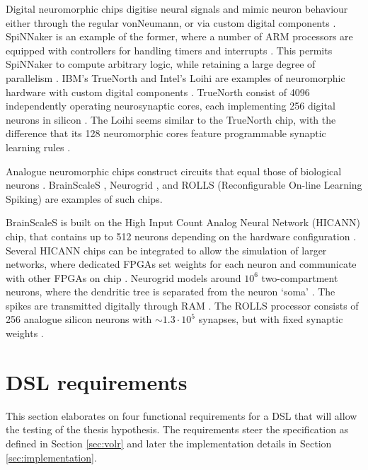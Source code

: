 \documentclass[report.tex]{subfiles}
\begin{document}
Digital neuromorphic chips digitise neural signals and mimic neuron
behaviour either through the regular \gls{vonNeumann}, or
via custom digital components \cite{Walter2015}.
SpiNNaker is an example of the former, where a number of \gls{ARM}
processors are equipped with controllers for handling timers and
interrupts \cite{Walter2015}.
This permits SpiNNaker to compute arbitrary logic, while retaining
a large degree of parallelism \cite{Albada2018}.
IBM's TrueNorth  and Intel's Loihi 
are examples of neuromorphic hardware with custom digital components 
\cite{Walter2015, Lin2018}.
TrueNorth consist of 4096 independently operating neurosynaptic cores, each implementing 256
digital neurons in silicon \cite{Walter2015, ArtificialBrains2018}.
The Loihi seems similar to the TrueNorth chip, with the difference that
its 128 neuromorphic cores feature programmable
synaptic learning rules \cite{Lin2018}.

Analogue neuromorphic chips construct circuits that equal those of biological
neurons \cite{Walter2015}.
BrainScaleS \cite{Schmitt2017}, Neurogrid \cite{BrainsInSilicon2018}, 
and ROLLS (Reconfigurable On-line Learning Spiking)
\cite{Walter2015} are examples of such chips.

BrainScaleS is built on the High Input Count Analog Neural Network (HICANN)
chip, that contains up to 512 neurons depending on the hardware configuration 
\cite{Pfeil2013}.
Several HICANN chips can be integrated to allow the simulation of larger
networks, where dedicated \gls{FPGA}s set weights for each neuron and
communicate with other \gls{FPGA}s on chip \cite{Walter2015}. 
Neurogrid models around $10^6$ two-compartment neurons, where the dendritic
tree is separated from the neuron `soma' \cite{Walter2015}.
The spikes are transmitted digitally through \gls{RAM} \cite{Walter2015}.
The ROLLS processor consists of 256 analogue silicon neurons with
$\sim1.3 \cdot 10^5$ synapses, but with fixed synaptic weights
\cite{Walter2015}.

\section{DSL requirements} \label{sec:requirements}
This section elaborates on four functional requirements for a \gls{DSL} that will allow the testing of the thesis hypothesis.
The requirements steer the specification as defined in Section 
\ref{sec:volr} and later the implementation details in Section
\ref{sec:implementation}.
\end{document}
